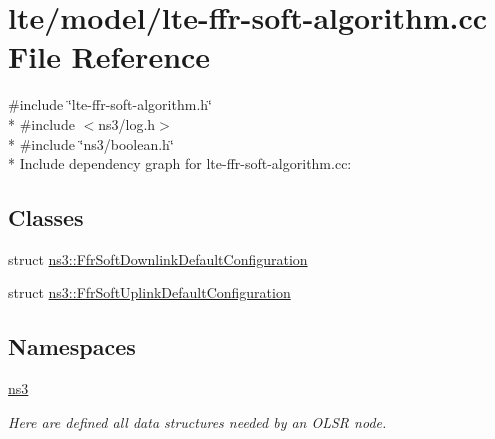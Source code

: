 \hypertarget{lte-ffr-soft-algorithm_8cc}{}\section{lte/model/lte-\/ffr-\/soft-\/algorithm.cc File Reference}
\label{lte-ffr-soft-algorithm_8cc}
{\ttfamily \#include \char`\"{}lte-\/ffr-\/soft-\/algorithm.\+h\char`\"{}}\\*
{\ttfamily \#include $<$ns3/log.\+h$>$}\\*
{\ttfamily \#include \char`\"{}ns3/boolean.\+h\char`\"{}}\\*
Include dependency graph for lte-\/ffr-\/soft-\/algorithm.cc\+:
\subsection*{Classes}
\begin{DoxyCompactItemize}
\item 
struct \hyperlink{structns3_1_1FfrSoftDownlinkDefaultConfiguration}{ns3\+::\+Ffr\+Soft\+Downlink\+Default\+Configuration}
\item 
struct \hyperlink{structns3_1_1FfrSoftUplinkDefaultConfiguration}{ns3\+::\+Ffr\+Soft\+Uplink\+Default\+Configuration}
\end{DoxyCompactItemize}
\subsection*{Namespaces}
\begin{DoxyCompactItemize}
\item 
 \hyperlink{namespacens3}{ns3}
\begin{DoxyCompactList}\small\item\em Here are defined all data structures needed by an O\+L\+SR node. \end{DoxyCompactList}\end{DoxyCompactItemize}
